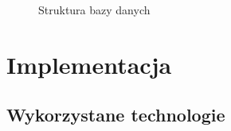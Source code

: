 \documentclass[12pt,a4paper,notitlepage]{article}
\begin{document}
\begin{figure}[H]
\begin{center}
\caption{Struktura bazy danych}
\end{center}
\end{figure}

\newpage
\section{Implementacja}
\subsection{Wykorzystane technologie}
\end{document}
